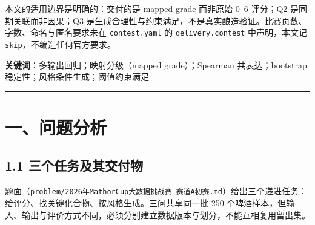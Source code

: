 \documentclass[
  11pt,
]{ctexart}
\begin{document}
本文的适用边界是明确的：交付的是 mapped grade 而非原始 0--6 评分；Q2
是同期关联而非因果；Q3
是生成合理性与约束满足，不是真实酿造验证。比赛页数、字数、命名与匿名要求未在
\texttt{contest.yaml} 的 \texttt{delivery.\allowbreak{}contest} 中声明，本文记
\texttt{skip}，不编造任何官方要求。

\textbf{关键词}：多输出回归；映射分级（mapped grade）；Spearman
共表达；bootstrap 稳定性；风格条件生成；阈值约束满足

\begin{center}\rule{0.5\linewidth}{0.5pt}\end{center}

\section{一、问题分析}\label{ux4e00ux95eeux9898ux5206ux6790}

\subsection{1.1
三个任务及其交付物}\label{ux4e09ux4e2aux4efbux52a1ux53caux5176ux4ea4ux4ed8ux7269}

题面（\texttt{problem/\allowbreak{}2026年MathorCup大数据挑战赛-赛道A初赛.\allowbreak{}md}）给出三个递进任务：给评分、找关键化合物、按风格生成。三问共享同一批
250
个啤酒样本，但输入、输出与评价方式不同，必须分别建立数据版本与划分，不能互相复用留出集。
\end{document}
